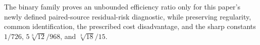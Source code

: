 The binary family proves an unbounded efficiency ratio only for this paper's newly defined paired-source residual-risk diagnostic, while preserving regularity, common identification, the prescribed cost disadvantage, and the sharp constants \(1/726\), \(5\sqrt[3]{12}/968\), and \(\sqrt[3]{18}/15\).